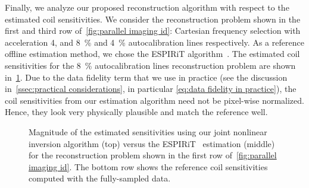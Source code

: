 Finally, we analyze our proposed reconstruction algorithm with respect to the estimated coil sensitivities.
We consider the reconstruction problem shown in the first and third row of~\cref{fig:parallel imaging id}:
Cartesian frequency selection with acceleration \num{4}, and \qty{8}{\percent} and \qty{4}{\percent} autocalibration lines respectively.
As a reference offline estimation method, we chose the ESPIRiT algorithm~\cite{uecker_espirit_13}.
The estimated coil sensitivities for the \qty{8}{\percent} autocalibration lines reconstruction problem are shown in~\cref{fig:sensitivities}.
Due to the data fidelity term that we use in practice (see the discussion in~\cref{ssec:practical considerations}, in particular \cref{eq:data fidelity in practice}), the coil sensitivities from our estimation algorithm need not be pixel-wise normalized.
Hence, they look very physically plausible and match the reference well.
\begin{figure}
	\caption[Qualitative comparison of estimated coil sensitivities]{%
		Magnitude of the estimated sensitivities using our joint nonlinear inversion algorithm (top) versus the ESPIRiT~\cite{uecker_espirit_13} estimation (middle) for the reconstruction problem shown in the first row of~\cref{fig:parallel imaging id}.
		The bottom row shows the reference coil sensitivities computed with the fully-sampled data.
	}%
	\label{fig:sensitivities}
\end{figure}

